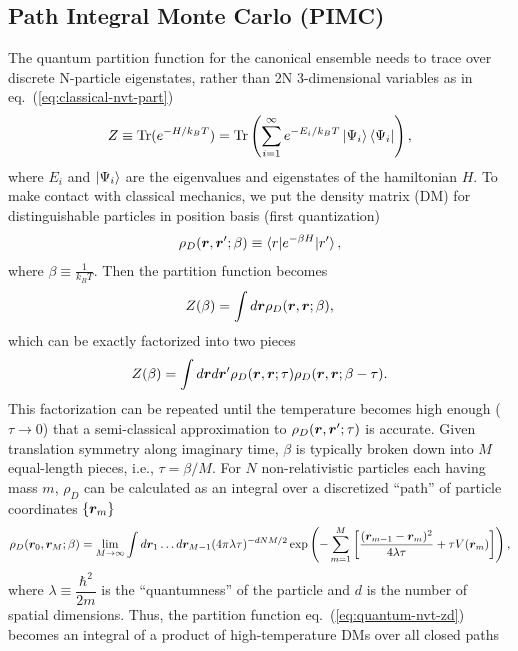 \subsection{Path Integral Monte Carlo (PIMC)}
The quantum partition function for the canonical ensemble needs to trace over discrete N-particle eigenstates, rather than 2N 3-dimensional variables as in eq.~(\ref{eq:classical-nvt-part})
\begin{align}
Z\equiv \text{Tr}(e^{-H/k_BT})=\text{Tr}\left(
\sum\limits_{i=1}^{\infty} e^{-E_i/k_BT}\ket{\Psi_i}\bra{\Psi_i}
\right),
\end{align}
where $E_i$ and $\ket{\Psi_i}$ are the eigenvalues and eigenstates of the hamiltonian $H$. To make contact with classical mechanics, we put the density matrix (DM) for distinguishable particles in position basis (first quantization)
\begin{align}
\rho_D(\boldsymbol{r}, \boldsymbol{r}'; \beta) \equiv \braket{r|e^{-\beta H}|r'},
\end{align}
where $\beta\equiv \frac{1}{k_B T}$. 
Then the partition function becomes
\begin{align} \label{eq:quantum-nvt-zd}
Z(\beta) = \int d\boldsymbol{r} \rho_D(\boldsymbol{r},\boldsymbol{r};\beta),
\end{align}
which can be exactly factorized into two pieces
\begin{align}
Z(\beta) = \int d\boldsymbol{r}d\boldsymbol{r}' \rho_D(\boldsymbol{r},\boldsymbol{r};\tau)\rho_D(\boldsymbol{r},\boldsymbol{r};\beta-\tau).
\end{align}
This factorization can be repeated until the temperature becomes high enough ($\tau\rightarrow0$) that a semi-classical approximation to $\rho_D(\boldsymbol{r},\boldsymbol{r}';\tau)$ is accurate. Given translation symmetry along imaginary time, $\beta$ is typically broken down into $M$ equal-length pieces, i.e., $\tau=\beta/M$.
For $N$ non-relativistic particles each having mass $m$, $\rho_D$ can be calculated as an integral over a discretized ``path'' of particle coordinates $\{\boldsymbol{r}_m\}$
\begin{align} \label{eq:pimc-rhod}
\rho_D(\boldsymbol{r}_0,\boldsymbol{r}_M;\beta) = \lim\limits_{M\rightarrow\infty} \int d\boldsymbol{r}_1\dots d\boldsymbol{r}_{M-1}
(4\pi\lambda\tau)^{-dNM/2}\exp\left(
-\sum\limits_{m=1}^M \left[
\dfrac{(\boldsymbol{r}_{m-1}-\boldsymbol{r}_m)^2}{4\lambda\tau} + \tau V(\boldsymbol{r}_m)
\right]
\right),
\end{align}
where $\lambda\equiv\dfrac{\hbar^2}{2m}$ is the ``quantumness'' of the particle and $d$ is the number of spatial dimensions. Thus, the partition function eq.~(\ref{eq:quantum-nvt-zd}) becomes an integral of a product of high-temperature DMs over all closed paths
